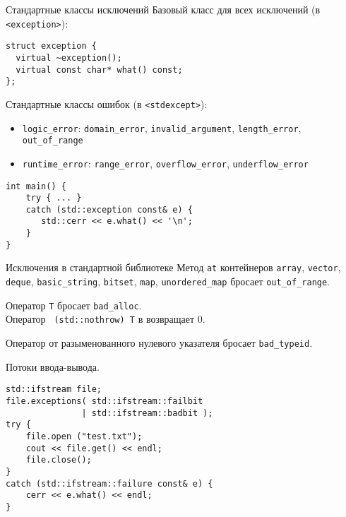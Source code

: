 \documentclass{beamer}
\begin{document}
\begin{frame}[fragile]{Стандартные классы исключений}
    Базовый класс для всех исключений (в {\tt <exception>}):
    \begin{lstlisting}
struct exception {
  virtual ~exception();
  virtual const char* what() const;
}; 
    \end{lstlisting}

    Стандартные классы ошибок (в {\tt <stdexcept>}):\\
    \begin{itemize}
        \item {\tt logic\_error}: 
     {\tt domain\_error}, {\tt invalid\_argument}, {\tt length\_error}, {\tt
     out\_of\_range} 
        \item {\tt runtime\_error}: 
        {\tt range\_error},
        {\tt overflow\_error}, 
        {\tt underflow\_error}
    \end{itemize}

\begin{lstlisting}
int main() {
    try { ... }
    catch (std::exception const& e) {
       std::cerr << e.what() << '\n';
    }
}
\end{lstlisting}
\end{frame}
 

\begin{frame}[fragile]{Исключения в стандартной библиотеке}
\small
        \fakeitem Метод \texttt{at} контейнеров {\tt array}, {\tt vector}, {\tt deque}, {\tt basic\_string}, {\tt bitset}, {\tt map}, {\tt unordered\_map} бросает {\tt out\_of\_range}.

        \fakeitem Оператор  {\tt T} бросает {\tt bad\_alloc}.\\
            Оператор {\tt {} (std::nothrow) T} в возвращает 0.
            
        \fakeitem Оператор  от разыменованного нулевого указателя бросает {\tt bad\_typeid}.

        \fakeitem Потоки ввода-вывода. 
            \begin{lstlisting}
std::ifstream file;
file.exceptions( std::ifstream::failbit 
               | std::ifstream::badbit );
try {
    file.open ("test.txt");
    cout << file.get() << endl;
    file.close();
}
catch (std::ifstream::failure const& e) {
    cerr << e.what() << endl;
}
            \end{lstlisting}
\end{frame}
\end{document}
